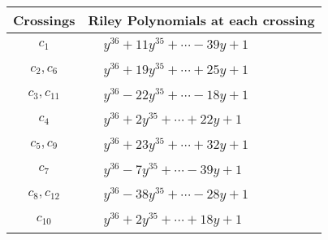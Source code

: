\documentclass[1p]{elsarticle_modified}
\theoremstyle{definition}
\begin{document}
\begin{tabular}{m{50pt}|m{274pt}}
Crossings & \hspace{64pt}Riley Polynomials at each crossing \\
\hline $$\begin{aligned}c_{1}\end{aligned}$$&$\begin{aligned}
&y^{36}+11 y^{35}+\cdots-39 y+1
\end{aligned}$\\
\hline $$\begin{aligned}c_{2},c_{6}\end{aligned}$$&$\begin{aligned}
&y^{36}+19 y^{35}+\cdots+25 y+1
\end{aligned}$\\
\hline $$\begin{aligned}c_{3},c_{11}\end{aligned}$$&$\begin{aligned}
&y^{36}-22 y^{35}+\cdots-18 y+1
\end{aligned}$\\
\hline $$\begin{aligned}c_{4}\end{aligned}$$&$\begin{aligned}
&y^{36}+2 y^{35}+\cdots+22 y+1
\end{aligned}$\\
\hline $$\begin{aligned}c_{5},c_{9}\end{aligned}$$&$\begin{aligned}
&y^{36}+23 y^{35}+\cdots+32 y+1
\end{aligned}$\\
\hline $$\begin{aligned}c_{7}\end{aligned}$$&$\begin{aligned}
&y^{36}-7 y^{35}+\cdots-39 y+1
\end{aligned}$\\
\hline $$\begin{aligned}c_{8},c_{12}\end{aligned}$$&$\begin{aligned}
&y^{36}-38 y^{35}+\cdots-28 y+1
\end{aligned}$\\
\hline $$\begin{aligned}c_{10}\end{aligned}$$&$\begin{aligned}
&y^{36}+2 y^{35}+\cdots+18 y+1
\end{aligned}$\\
\hline
\end{tabular}\\~\\
\end{document}
